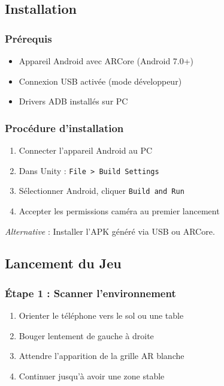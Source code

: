 \documentclass[12pt,a4paper]{article}
\begin{document}
\subsection{Installation}

\subsubsection{Prérequis}
\begin{itemize}
    \item Appareil Android avec ARCore (Android 7.0+)
    \item Connexion USB activée (mode développeur)
    \item Drivers ADB installés sur PC
\end{itemize}

\subsubsection{Procédure d'installation}
\begin{enumerate}
    \item Connecter l'appareil Android au PC
    \item Dans Unity : \texttt{File > Build Settings}
    \item Sélectionner Android, cliquer \texttt{Build and Run}
    \item Accepter les permissions caméra au premier lancement
\end{enumerate}

\textit{Alternative} : Installer l'APK généré via USB ou ARCore.

\subsection{Lancement du Jeu}

\subsubsection{Étape 1 : Scanner l'environnement}
\begin{enumerate}
    \item Orienter le téléphone vers le sol ou une table
    \item Bouger lentement de gauche à droite
    \item Attendre l'apparition de la grille AR blanche
    \item Continuer jusqu'à avoir une zone stable
\end{enumerate}
\end{document}

